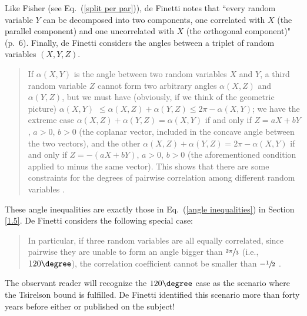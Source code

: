 Like Fisher (see Eq.\ (\ref{split per par})), de Finetti notes that ``every random variable $Y$ can be decomposed into two components, one correlated with $X$ (the parallel component) and one uncorrelated with $X$ (the orthogonal component)" (p.\ 6). Finally, de Finetti considers the angles between a triplet of random variables $(X, Y, Z)$.
\begin{quote}
If $\alpha(X, Y)$ is the angle between two random variables $X$ and $Y$, a third random variable $Z$ cannot form two arbitrary angles $\alpha(X, Z)$ and $\alpha(Y, Z)$, but we must have (obviously, if we think of the geometric picture) $\alpha (X, Y)$ $\leq \alpha(X, Z) + \alpha(Y, Z) \leq 2 \pi - \alpha (X, Y)$; we have the extreme case $\alpha(X, Z) + \alpha(Y, Z) = \alpha(X, Y)$ if and only if $Z = aX + bY$, $a > 0$, $b > 0$ (the coplanar vector, included in the concave angle between the two vectors), and the other $\alpha(X, Z) + \alpha(Y, Z) = 2 \pi - \alpha(X, Y)$ if and only if $Z = -(aX + bY)$, $a> 0$, $b > $0 (the aforementioned condition applied to minus the same vector). This shows that there are some constraints for the degrees of pairwise correlation among different random variables  \citep[p.\ 6]{De Finetti 1937}.
\end{quote}
These angle inequalities are exactly those in Eq.\ (\ref{angle inequalities}) in Section \ref{1.5}. De Finetti considers the following special case:
\begin{quote}
In particular, if three random variables are all equally correlated, since pairwise they are unable to form an angle bigger than $\sfrac{2\pi}{3}$ (i.e., $120\degree$), the correlation coefficient cannot be smaller than $-\sfrac12$ \citep[pp.\ 6--7]{De Finetti 1937}.
\end{quote}
The observant reader will recognize the $120\degree$ case as the scenario where the Tsirelson bound is fulfilled. De Finetti identified this scenario more than forty years before either \citet{Cirel'son 1980} or \citet[see note \ref{Accardi Fedullo}]{Accardi and Fedullo 1982} published on the subject!
